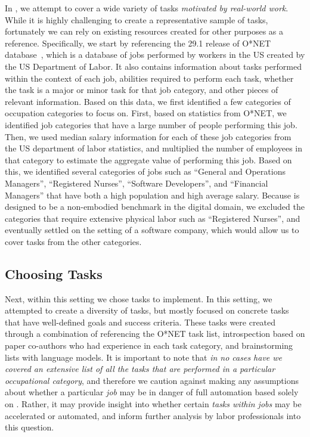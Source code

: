 \documentclass{article}
\begin{document}
In \tac, we attempt to cover a wide variety of tasks \emph{motivated by real-world work}.
While it is highly challenging to create a representative sample of tasks, fortunately we can rely on existing resources created for other purposes as a reference.
Specifically, we start by referencing the 29.1 release of O*NET  database~\citep{onetonlinedb,rounds1999development}, which is a database of jobs performed by workers in the US created by the US Department of Labor. 
It also contains information about tasks performed within the context of each job, abilities required to perform each task, whether the task is a major or minor task for that job category, and other pieces of relevant information.
Based on this data, we first identified a few categories of occupation categories to focus on.
First, based on statistics from O*NET, we identified job categories that have a large number of people performing this job.
Then, we used median salary information for each of these job categories from the US department of labor statistics, and multiplied the number of employees in that category to estimate the aggregate value of performing this job.
Based on this, we identified several categories of jobs such as ``General and Operations Managers'', ``Registered Nurses'', ``Software Developers'', and ``Financial Managers'' that have both a high population and high average salary.
Because \tac is designed to be a non-embodied benchmark in the digital domain, we excluded the categories that require extensive physical labor such as ``Registered Nurses'', and eventually settled on the setting of a software company, which would allow us to cover tasks from the other categories.

\subsection{Choosing Tasks}
\vspace{-1mm}
Next, within this setting we chose tasks to implement.
In this setting, we attempted to create a diversity of tasks, but mostly focused on concrete tasks that have well-defined goals and success criteria.
These tasks were created through a combination of referencing the O*NET task list, introspection based on paper co-authors who had experience in each task category, and brainstorming lists with language models.
It is important to note that \emph{in no cases have we covered an extensive list of all the tasks that are performed in a particular occupational category}, and therefore we caution against making any assumptions about whether a particular \emph{job} may be in danger of full automation based solely on \tac.
Rather, it may provide insight into whether certain \emph{tasks within jobs} may be accelerated or automated, and inform further analysis by labor professionals into this question.
\end{document}
